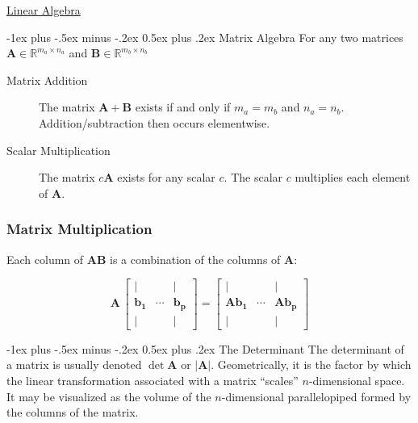 \documentclass[10pt,landscape,letterpaper]{article}
\makeatletter
\renewcommand{\section}{\@startsection{section}{1}{0mm}%
                                {-1ex plus -.5ex minus -.2ex}%
                                {0.5ex plus .2ex}%
                                {\normalfont\large\bfseries}}
\newcommand{\matr}[1]{\mathbf{#1}}
\newcommand{\bvec}[1]{\mathbf{#1}}
\newcommand{\vecspace}[1]{\mathbb{#1}}
\makeatother
\begin{document}
\begin{multicols}{3}
    
\setlength{\premulticols}{1pt}
\setlength{\postmulticols}{1pt}
\setlength{\multicolsep}{1pt}
\setlength{\columnsep}{2pt}

\begin{center}
    \Large{\underline{Linear Algebra}} \\
\end{center}

\section{Matrix Algebra}
For any two matrices $\matr{A} \in \vecspace{R}^{m_a \times n_a}$ and $\matr{B} \in \vecspace{R}^{m_b \times n_b}$
\begin{description}
    \item[Matrix Addition] The matrix $\matr{A+B}$ exists if and only if $m_a = m_b$ and $n_a = n_b$. Addition/subtraction then occurs elementwise.
    \item[Scalar Multiplication] The matrix $c\matr{A}$ exists for any scalar $c$. The scalar $c$ multiplies each element of $\matr{A}$.
\end{description}

\subsubsection{Matrix Multiplication}
Each column of $\matr{AB}$ is a combination of the columns of $\matr{A}$:

\begin{equation*}
\matr{A} \, \begin{bmatrix}
\vert & & \vert \\
\bvec{b_1} & \cdots & \bvec{b_p} \\
\vert & & \vert
\end{bmatrix} = \begin{bmatrix}
\vert & & \vert \\
\matr{A}\bvec{b_1} & \cdots & \matr{A}\bvec{b_p} \\
\vert & & \vert
\end{bmatrix}
\end{equation*}

\section{The Determinant}
The determinant of a matrix is usually denoted $\det \matr{A}$ or $|\matr{A}|$. Geometrically, it is the factor by which the linear transformation associated with a matrix ``scales'' $n$-dimensional space. It may be visualized as the volume of the $n$-dimensional parallelopiped formed by the columns of the matrix.


\end{multicols}
\end{document}
